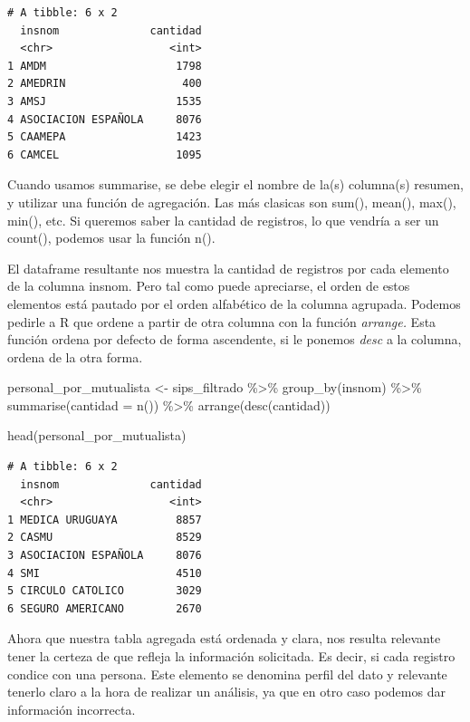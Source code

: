 \documentclass[
  letterpaper,
  DIV=11,
  numbers=noendperiod]{scrreprt}
\newenvironment{Shaded}{\begin{snugshade}}{\end{snugshade}}
\newcommand{\AttributeTok}[1]{\textcolor[rgb]{0.40,0.45,0.13}{#1}}
\newcommand{\FunctionTok}[1]{\textcolor[rgb]{0.28,0.35,0.67}{#1}}
\newcommand{\NormalTok}[1]{\textcolor[rgb]{0.00,0.23,0.31}{#1}}
\newcommand{\OtherTok}[1]{\textcolor[rgb]{0.00,0.23,0.31}{#1}}
\newcommand{\SpecialCharTok}[1]{\textcolor[rgb]{0.37,0.37,0.37}{#1}}
\begin{document}
\begin{verbatim}
# A tibble: 6 x 2
  insnom              cantidad
  <chr>                  <int>
1 AMDM                    1798
2 AMEDRIN                  400
3 AMSJ                    1535
4 ASOCIACION ESPAÑOLA     8076
5 CAAMEPA                 1423
6 CAMCEL                  1095
\end{verbatim}

Cuando usamos summarise, se debe elegir el nombre de la(s) columna(s)
resumen, y utilizar una función de agregación. Las más clasicas son
sum(), mean(), max(), min(), etc. Si queremos saber la cantidad de
registros, lo que vendría a ser un count(), podemos usar la función n().

El dataframe resultante nos muestra la cantidad de registros por cada
elemento de la columna insnom. Pero tal como puede apreciarse, el orden
de estos elementos está pautado por el orden alfabético de la columna
agrupada. Podemos pedirle a R que ordene a partir de otra columna con la
función \emph{arrange.} Esta función ordena por defecto de forma
ascendente, si le ponemos \emph{desc} a la columna, ordena de la otra
forma.

\begin{Shaded}
\begin{Highlighting}[]
\NormalTok{personal\_por\_mutualista }\OtherTok{\textless{}{-}}\NormalTok{ sips\_filtrado }\SpecialCharTok{\%\textgreater{}\%} 
  \FunctionTok{group\_by}\NormalTok{(insnom) }\SpecialCharTok{\%\textgreater{}\%} 
  \FunctionTok{summarise}\NormalTok{(}\AttributeTok{cantidad =} \FunctionTok{n}\NormalTok{()) }\SpecialCharTok{\%\textgreater{}\%} 
  \FunctionTok{arrange}\NormalTok{(}\FunctionTok{desc}\NormalTok{(cantidad))}

\FunctionTok{head}\NormalTok{(personal\_por\_mutualista)}
\end{Highlighting}
\end{Shaded}

\begin{verbatim}
# A tibble: 6 x 2
  insnom              cantidad
  <chr>                  <int>
1 MEDICA URUGUAYA         8857
2 CASMU                   8529
3 ASOCIACION ESPAÑOLA     8076
4 SMI                     4510
5 CIRCULO CATOLICO        3029
6 SEGURO AMERICANO        2670
\end{verbatim}

Ahora que nuestra tabla agregada está ordenada y clara, nos resulta
relevante tener la certeza de que refleja la información solicitada. Es
decir, si cada registro condice con una persona. Este elemento se
denomina perfil del dato y relevante tenerlo claro a la hora de realizar
un análisis, ya que en otro caso podemos dar información incorrecta.
\end{document}

